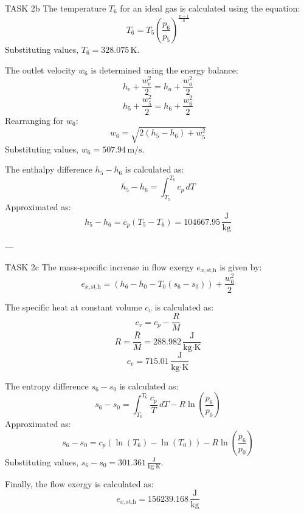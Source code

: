 TASK 2b  
The temperature \( T_6 \) for an ideal gas is calculated using the equation:  
\[
T_6 = T_5 \left( \frac{p_6}{p_5} \right)^{\frac{n-1}{n}}
\]  
Substituting values, \( T_6 = 328.075 \, \text{K} \).

The outlet velocity \( w_6 \) is determined using the energy balance:  
\[
h_e + \frac{w_e^2}{2} = h_a + \frac{w_a^2}{2}
\]  
\[
h_5 + \frac{w_5^2}{2} = h_6 + \frac{w_6^2}{2}
\]  
Rearranging for \( w_6 \):  
\[
w_6 = \sqrt{2(h_5 - h_6) + w_5^2}
\]  
Substituting values, \( w_6 = 507.94 \, \text{m/s} \).

The enthalpy difference \( h_5 - h_6 \) is calculated as:  
\[
h_5 - h_6 = \int_{T_5}^{T_6} c_p \, dT
\]  
Approximated as:  
\[
h_5 - h_6 = c_p (T_5 - T_6) = 104667.95 \, \frac{\text{J}}{\text{kg}}
\]

---

TASK 2c  
The mass-specific increase in flow exergy \( e_{x,\text{st,h}} \) is given by:  
\[
e_{x,\text{st,h}} = (h_6 - h_0 - T_0 (s_6 - s_0)) + \frac{w_6^2}{2}
\]  

The specific heat at constant volume \( c_v \) is calculated as:  
\[
c_v = c_p - \frac{R}{M}
\]  
\[
R = \frac{\bar{R}}{M} = 288.982 \, \frac{\text{J}}{\text{kg·K}}
\]  
\[
c_v = 715.01 \, \frac{\text{J}}{\text{kg·K}}
\]

The entropy difference \( s_6 - s_0 \) is calculated as:  
\[
s_6 - s_0 = \int_{T_0}^{T_6} \frac{c_p}{T} \, dT - R \ln \left( \frac{p_6}{p_0} \right)
\]  
Approximated as:  
\[
s_6 - s_0 = c_p (\ln(T_6) - \ln(T_0)) - R \ln \left( \frac{p_6}{p_0} \right)
\]  
Substituting values, \( s_6 - s_0 = 301.361 \, \frac{\text{J}}{\text{kg·K}} \).

Finally, the flow exergy is calculated as:  
\[
e_{x,\text{st,h}} = 156239.168 \, \frac{\text{J}}{\text{kg}}
\]